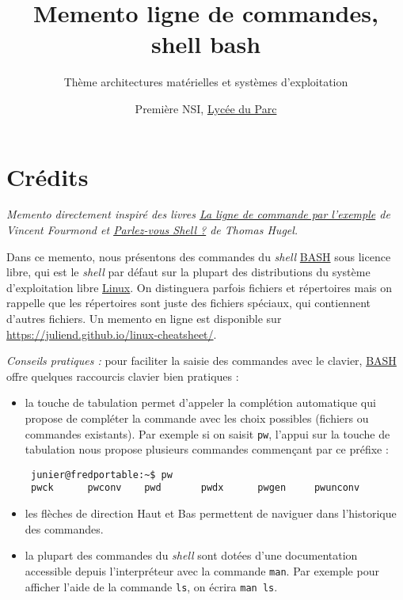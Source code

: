 \documentclass[
  11pt,
]{article}
\title{Memento ligne de commandes, shell bash}
\subtitle{Thème architectures matérielles et systèmes d'exploitation}
\author{Première NSI, \href{https://frederic-junier.org/}{Lycée du
Parc}}
\date{}
\newcounter{prop}
\newcounter{histo}
\begin{document}
\maketitle

\renewcommand*\contentsname{Table des matières}
{
\hypersetup{linkcolor=}
\setcounter{tocdepth}{3}
\tableofcontents
}
\hypertarget{cruxe9dits}{%
\section*{Crédits}\label{cruxe9dits}}

\emph{Memento directement inspiré des livres
\href{https://www.eyrolles.com/Informatique/Livre/la-ligne-de-commande-par-l-exemple-9782351410721/}{La
ligne de commande par l'exemple} de Vincent Fourmond et
\href{https://www.eyrolles.com/Informatique/Livre/parlez-vous-shell--9782729877590/}{Parlez-vous
Shell ?} de Thomas Hugel.}

Dans ce memento, nous présentons des commandes du \emph{shell}
\href{https://fr.wikipedia.org/wiki/Bourne-Again_shell}{BASH} sous
licence libre, qui est le \emph{shell} par défaut sur la plupart des
distributions du système d'exploitation libre
\href{https://fr.wikipedia.org/wiki/Linux}{Linux}. On distinguera
parfois fichiers et répertoires mais on rappelle que les répertoires
sont juste des fichiers spéciaux, qui contiennent d'autres fichiers. Un
memento en ligne est disponible sur
\url{https://juliend.github.io/linux-cheatsheet/}.

\emph{Conseils pratiques :} pour faciliter la saisie des commandes avec
le clavier,
\href{https://fr.wikipedia.org/wiki/Bourne-Again_shell}{BASH} offre
quelques raccourcis clavier bien pratiques :

\begin{itemize}
\item
  la touche de tabulation permet d'appeler la complétion automatique qui
  propose de compléter la commande avec les choix possibles (fichiers ou
  commandes existants). Par exemple si on saisit \texttt{pw}, l'appui
  sur la touche de tabulation nous propose plusieurs commandes
  commençant par ce préfixe :

\begin{verbatim}
 junier@fredportable:~$ pw
 pwck      pwconv    pwd       pwdx      pwgen     pwunconv 
\end{verbatim}
\item
  les flèches de direction Haut et Bas permettent de naviguer dans
  l'historique des commandes.
\item
  la plupart des commandes du \emph{shell} sont dotées d'une
  documentation accessible depuis l'interpréteur avec la commande
  \texttt{man}. Par exemple pour afficher l'aide de la commande
  \texttt{ls}, on écrira \texttt{man\ ls}.
\end{itemize}
\end{document}
